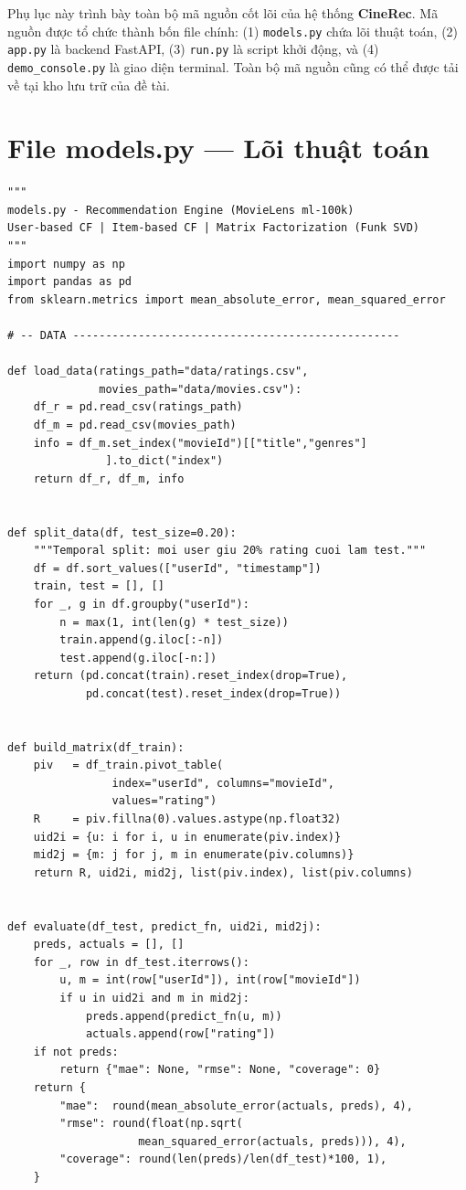 ﻿\documentclass[../BTL.tex]{subfiles}
\begin{document}
Phụ lục này trình bày toàn bộ mã nguồn cốt lõi của hệ thống
\textbf{CineRec}. Mã nguồn được tổ chức thành bốn file chính: (1)
\texttt{models.py} chứa lõi thuật toán, (2) \texttt{app.py} là backend
FastAPI, (3) \texttt{run.py} là script khởi động, và (4)
\texttt{demo\_console.py} là giao diện terminal. Toàn bộ mã nguồn cũng có
thể được tải về tại kho lưu trữ của đề tài.

\section{File models.py — Lõi thuật toán}
\label{appendix:models}

\begin{lstlisting}[style=python,
    caption={models.py -- User-based CF / Item-based CF /
              Matrix Factorization / RecommendationSystem facade}]
"""
models.py - Recommendation Engine (MovieLens ml-100k)
User-based CF | Item-based CF | Matrix Factorization (Funk SVD)
"""
import numpy as np
import pandas as pd
from sklearn.metrics import mean_absolute_error, mean_squared_error

# -- DATA --------------------------------------------------

def load_data(ratings_path="data/ratings.csv",
              movies_path="data/movies.csv"):
    df_r = pd.read_csv(ratings_path)
    df_m = pd.read_csv(movies_path)
    info = df_m.set_index("movieId")[["title","genres"]
               ].to_dict("index")
    return df_r, df_m, info


def split_data(df, test_size=0.20):
    """Temporal split: moi user giu 20% rating cuoi lam test."""
    df = df.sort_values(["userId", "timestamp"])
    train, test = [], []
    for _, g in df.groupby("userId"):
        n = max(1, int(len(g) * test_size))
        train.append(g.iloc[:-n])
        test.append(g.iloc[-n:])
    return (pd.concat(train).reset_index(drop=True),
            pd.concat(test).reset_index(drop=True))


def build_matrix(df_train):
    piv   = df_train.pivot_table(
                index="userId", columns="movieId",
                values="rating")
    R     = piv.fillna(0).values.astype(np.float32)
    uid2i = {u: i for i, u in enumerate(piv.index)}
    mid2j = {m: j for j, m in enumerate(piv.columns)}
    return R, uid2i, mid2j, list(piv.index), list(piv.columns)


def evaluate(df_test, predict_fn, uid2i, mid2j):
    preds, actuals = [], []
    for _, row in df_test.iterrows():
        u, m = int(row["userId"]), int(row["movieId"])
        if u in uid2i and m in mid2j:
            preds.append(predict_fn(u, m))
            actuals.append(row["rating"])
    if not preds:
        return {"mae": None, "rmse": None, "coverage": 0}
    return {
        "mae":  round(mean_absolute_error(actuals, preds), 4),
        "rmse": round(float(np.sqrt(
                    mean_squared_error(actuals, preds))), 4),
        "coverage": round(len(preds)/len(df_test)*100, 1),
    }



\end{lstlisting}
\end{document}
